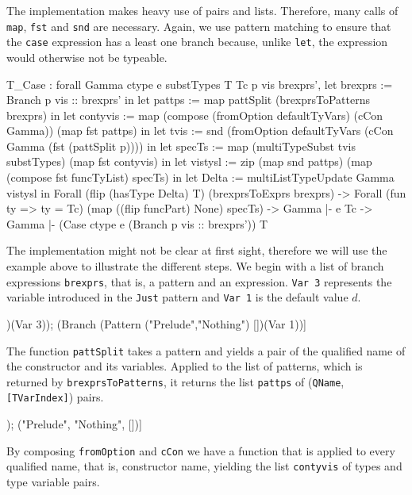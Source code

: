 \documentclass[fleqn, abstract=on]{scrreprt}
\newcommand{\todo}[1]{\marginpar{\textbf{TODO:} #1}}
\newcommand{\coqinline}[1]{\texttt{#1}}
\begin{document}
The implementation makes heavy use of pairs and lists. Therefore, many calls of \coqinline{map}, \coqinline{fst} and \coqinline{snd} are necessary. Again, we use pattern matching to ensure that the \texttt{case} expression has a least one branch because, unlike \texttt{let}, the expression would otherwise not be typeable.
\todo{CamelCase im Code}
\begin{coqcode}
T_Case : forall Gamma ctype e substTypes T Tc p vis brexprs',
           let  brexprs := Branch p vis :: brexprs' in
           let   pattps := map pattSplit (brexprsToPatterns brexprs) in
           let contyvis := map (compose (fromOption defaultTyVars) (cCon Gamma))
                               (map fst pattps) in
           let     tvis := snd (fromOption defaultTyVars (cCon Gamma (fst (pattSplit p)))) in
           let   specTs := map (multiTypeSubst tvis substTypes)
                               (map fst contyvis) in
           let  vistysl := zip (map snd pattps)
                               (map (compose fst funcTyList) specTs) in
           let    Delta := multiListTypeUpdate Gamma vistysl
            in Forall (flip (hasType Delta) T) (brexprsToExprs brexprs) ->
               Forall (fun ty => ty = Tc) (map ((flip funcPart) None) specTs) ->
               Gamma |- e \in Tc ->
         Gamma |- (Case ctype e (Branch p vis :: brexprs')) \in T
\end{coqcode}
The implementation might not be clear at first sight, therefore we will use the example above to illustrate the different steps. We begin with a list of branch expressions \texttt{brexprs}, that is, a pattern and an expression. \texttt{Var 3} represents the variable introduced in the \texttt{Just} pattern and \texttt{Var 1} is the default value $d$.
\begin{coqcode}
[(Branch (Pattern ("Prelude","Just")   [3])(Var 3));
 (Branch (Pattern ("Prelude","Nothing") [])(Var 1))]
\end{coqcode}
The function \coqinline{pattSplit} takes a pattern and yields a pair of the qualified name of the constructor and its variables. Applied to the list of patterns, which is returned by \coqinline{brexprsToPatterns}, it returns the list \texttt{pattps} of (\coqinline{QName}, \coqinline{[TVarIndex]}) pairs.
\begin{coqcode}
[("Prelude", "Just", [3]); ("Prelude", "Nothing", [])]
\end{coqcode}
By composing \coqinline{fromOption} and \coqinline{cCon} we have a function that is applied to every qualified name, that is, constructor name, yielding the list \texttt{contyvis} of types and type variable pairs.
\end{document}
